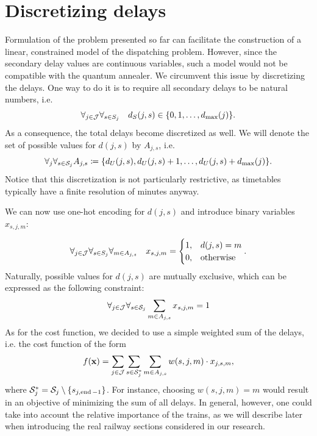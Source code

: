 \section{Discretizing delays}
Formulation of the problem presented so far can facilitate the construction of
a linear, constrained model of the dispatching problem. However, since the
secondary delay values are continuous variables, such a model would not be
compatible with the quantum annealer. We circumvent this issue by discretizing
the delays. One way to do it is to require all secondary delays to be
natural numbers, i.e.
\begin{equation}
  \forall_{j \in \mathcal{J}} \forall_{s \in S_{j}}\quad  d_{S}(j, s) \in \{0, 1, \ldots, d_{\max}(j)\}.
\end{equation}
As a consequence, the total delays become discretized as well. We will denote
the set of possible values for $d(j, s)$ by $A_{j, s}$, i.e.
\begin{equation}
  \forall_{j}\forall_{s \in \mathcal{S}_j}  A_{j, s} \coloneq \{d_{U}(j, s), d_{U}(j, s) + 1, \ldots, d_{U}(j, s) + d_{\max}(j)\}.
\end{equation}
Notice that this discretization is not particularly restrictive, as timetables
typically have a finite resolution of minutes anyway.

We can now use one-hot encoding for $d(j, s)$ and introduce binary variables
$x_{s, j, m}$:

\begin{equation}
  \forall_{j \in \mathcal{J}}\forall_{s \in S_{j}} \forall_{m \in A_{j, s}} \quad x_{s,j,m} = \begin{cases}
    1, & d(j, s) = m      \\
    0, & \mbox{otherwise}
  \end{cases}.
\end{equation}
Naturally, possible values for $d(j, s)$ are mutually exclusive, which can be
expressed as the following constraint:
\begin{equation}
  \label{eq:onehotconstraint}
  \forall_{j \in \mathcal{J}}\forall_{s \in \mathcal{S}_j} \sum_{m \in A_{j, s}} x_{s, j, m} = 1
\end{equation}
As for the cost function, we decided to use a simple weighted sum of the
delays, i.e. the cost function of the form
\begin{equation}
  \label{eq:qubo:cost}
  f(\mathbf{x}) = \sum_{j \in \mathcal{J}}\sum_{s \in \mathcal{S}_{j}^{*}} \sum_{m \in A_{j,s}} w(s,j,m) \cdot x_{j,s,m},
\end{equation}
where $\mathcal{S}_{j}^{*} = \mathcal{S}_j \setminus \{s_{j,\operatorname*{end}-1}\}$. For instance, choosing $w(s, j,
  m)=m$ would result in an objective of minimizing the sum of all delays. In
general, however, one could take into account the relative importance of the
trains, as we will describe later when introducing the real railway sections
considered in our research.

